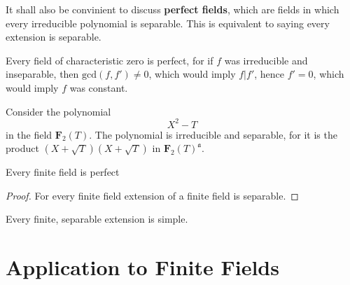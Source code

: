 It shall also be convinient to discuss {\bf perfect fields}, which are fields in which every irreducible polynomial is separable. This is equivalent to saying every extension is separable.

\begin{example}
    Every field of characteristic zero is perfect, for if $f$ was irreducible and inseparable, then $\text{gcd}(f, f') \neq 0$, which would imply $f | f'$, hence $f' = 0$, which would imply $f$ was constant.
\end{example}

\begin{example}
    Consider the polynomial
    \[ X^2 - T \]
    in the field $\mathbf{F}_2(T)$. The polynomial is irreducible and separable, for it is the product $(X + \sqrt{T})(X + \sqrt{T})$ in $\mathbf{F}_2(T)^{\mathfrak{a}}$.
\end{example}

\begin{theorem}
    Every finite field is perfect
\end{theorem}
\begin{proof}
    For every finite field extension of a finite field is separable.
\end{proof}

\begin{corollary}
    Every finite, separable extension is simple.
\end{corollary}



\section{Application to Finite Fields}

